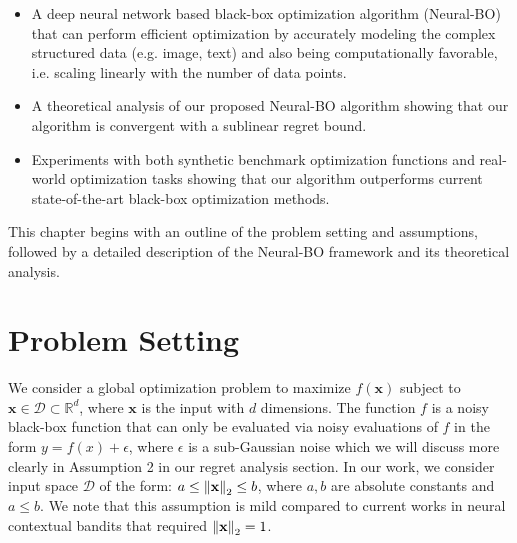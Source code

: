 \begin{itemize}
    \item A deep neural network based black-box optimization algorithm (Neural-BO) that can perform efficient optimization by accurately modeling the complex structured data (e.g. image, text) and also being computationally favorable, i.e. scaling linearly with the number of data points.
    \item A theoretical analysis of our proposed Neural-BO algorithm showing that our algorithm is convergent with a sublinear regret bound. 
    \item Experiments with both synthetic benchmark optimization functions and real-world optimization tasks showing that our algorithm outperforms current state-of-the-art black-box optimization methods.
\end{itemize} 

This chapter begins with an outline of the problem setting and assumptions, followed by a detailed description of the Neural-BO framework and its theoretical analysis. 


\section{Problem Setting}
\label{section:neural-bo_problem_setting}
We consider a global optimization problem to maximize $f(\mathbf{x})$ subject to $\mathbf{x} \in \mathcal D \subset \mathbb{R}^d$, where $\mathbf{x}$ is the input with $d$ dimensions. The function $f$ is a noisy black-box function that can only be evaluated via noisy evaluations of $f$ in the form  $y= f(x) + \epsilon$, where $\epsilon$ is a sub-Gaussian noise which we will discuss more clearly in Assumption 2 in our regret analysis section. In our work, we consider input space $\mathcal D$ of the form: $a \leq \norm{\mathbf{x}}_2 \leq  b$,  where $a, b$ are absolute constants and $a \le b$. We note that this assumption is mild compared to current works in neural contextual bandits \citep{zhou2020neural,zhang2021neural,xu2022neural,kassraie2022neural} that required $\norm{\mathbf{x}}_2 = 1$.  


